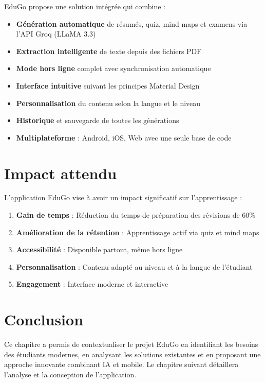 \documentclass[12pt,a4paper]{report}
\begin{document}
EduGo propose une solution intégrée qui combine :

\begin{itemize}
    \item \textbf{Génération automatique} de résumés, quiz, mind maps et examens via l'API Groq (LLaMA 3.3)
    \item \textbf{Extraction intelligente} de texte depuis des fichiers PDF
    \item \textbf{Mode hors ligne} complet avec synchronisation automatique
    \item \textbf{Interface intuitive} suivant les principes Material Design
    \item \textbf{Personnalisation} du contenu selon la langue et le niveau
    \item \textbf{Historique} et sauvegarde de toutes les générations
    \item \textbf{Multiplateforme} : Android, iOS, Web avec une seule base de code
\end{itemize}

\section{Impact attendu}

L'application EduGo vise à avoir un impact significatif sur l'apprentissage :

\begin{enumerate}
    \item \textbf{Gain de temps} : Réduction du temps de préparation des révisions de 60\%
    \item \textbf{Amélioration de la rétention} : Apprentissage actif via quiz et mind maps
    \item \textbf{Accessibilité} : Disponible partout, même hors ligne
    \item \textbf{Personnalisation} : Contenu adapté au niveau et à la langue de l'étudiant
    \item \textbf{Engagement} : Interface moderne et interactive
\end{enumerate}

\section{Conclusion}

Ce chapitre a permis de contextualiser le projet EduGo en identifiant les besoins des étudiants modernes, en analysant les solutions existantes et en proposant une approche innovante combinant IA et mobile. Le chapitre suivant détaillera l'analyse et la conception de l'application.
\end{document}
